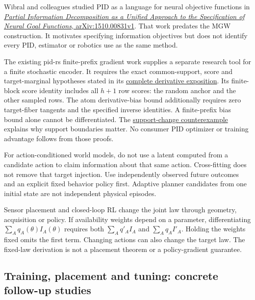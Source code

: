 \documentclass[11pt,a4paper]{article}
\begin{document}
Wibral and colleagues studied PID as a language for neural objective functions in \href{https://arxiv.org/abs/1510.00831v1}{\emph{Partial Information Decomposition as a Unified Approach to the Specification of Neural Goal Functions}, arXiv:1510.00831v1}. That work predates the MGW construction. It motivates specifying information objectives but does not identify every PID, estimator or robotics use as the same method.

The existing pid-rs finite-prefix gradient work supplies a separate research tool for a finite stochastic encoder. It requires the exact common-support, score and target-marginal hypotheses stated in its \href{https://github.com/sepahead/pid-rs/blob/main/audit/research/finite-prefix-mgw-gradient/EXPOSITION.md}{complete derivative exposition}. Its finite-block score identity includes all \(h+1\) row scores: the random anchor and the other sampled rows. The atom derivative-bias bound additionally requires zero target-fiber tangents and the specified inverse identities. A finite-prefix bias bound alone cannot be differentiated. The \href{https://github.com/sepahead/pid-rs/blob/main/audit/research/support-change-mi-cusp/EXPOSITION.md}{support-change counterexample} explains why support boundaries matter. No consumer PID optimizer or training advantage follows from those proofs.

For action-conditioned world models, do not use a latent computed from a candidate action to claim information about that same action. Cross-fitting does not remove that target injection. Use independently observed future outcomes and an explicit fixed behavior policy first. Adaptive planner candidates from one initial state are not independent physical episodes.

Sensor placement and closed-loop RL change the joint law through geometry, acquisition or policy. If availability weights depend on a parameter, differentiating \(\sum_Aq_A(\theta)I_A(\theta)\) requires both \(\sum_Aq'_A I_A\) and \(\sum_Aq_A I'_A\). Holding the weights fixed omits the first term. Changing actions can also change the target law. The fixed-law derivation is not a placement theorem or a policy-gradient guarantee.

\par{}

\subsection{Training, placement and tuning: concrete follow-up studies}\label{training-placement-and-tuning-concrete-follow-up-studies}
\end{document}
